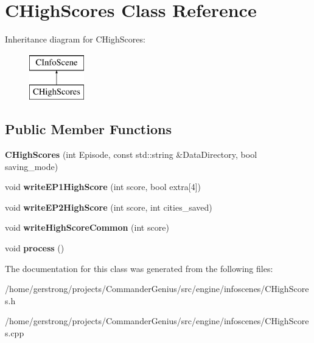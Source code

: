 \hypertarget{class_c_high_scores}{
\section{CHighScores Class Reference}
\label{class_c_high_scores}
}
Inheritance diagram for CHighScores:\begin{figure}[H]
\begin{center}
\leavevmode
\includegraphics[height=2cm]{class_c_high_scores}
\end{center}
\end{figure}
\subsection*{Public Member Functions}
\begin{DoxyCompactItemize}
\item 
\hypertarget{class_c_high_scores_a0e7283df2cd0f785c17f355d31e802a8}{
{\bfseries CHighScores} (int Episode, const std::string \&DataDirectory, bool saving\_\-mode)}
\label{class_c_high_scores_a0e7283df2cd0f785c17f355d31e802a8}

\item 
\hypertarget{class_c_high_scores_abb10e42cfbe3ed8706d0a9bbb3a17d5f}{
void {\bfseries writeEP1HighScore} (int score, bool extra\mbox{[}4\mbox{]})}
\label{class_c_high_scores_abb10e42cfbe3ed8706d0a9bbb3a17d5f}

\item 
\hypertarget{class_c_high_scores_a52badfd542df20d7690cb4491e16974e}{
void {\bfseries writeEP2HighScore} (int score, int cities\_\-saved)}
\label{class_c_high_scores_a52badfd542df20d7690cb4491e16974e}

\item 
\hypertarget{class_c_high_scores_a930e9a214fc9db2a5f450f996070048e}{
void {\bfseries writeHighScoreCommon} (int score)}
\label{class_c_high_scores_a930e9a214fc9db2a5f450f996070048e}

\item 
\hypertarget{class_c_high_scores_a07985814787f4594a8e21cd43e57df6b}{
void {\bfseries process} ()}
\label{class_c_high_scores_a07985814787f4594a8e21cd43e57df6b}

\end{DoxyCompactItemize}


The documentation for this class was generated from the following files:\begin{DoxyCompactItemize}
\item 
/home/gerstrong/projects/CommanderGenius/src/engine/infoscenes/CHighScores.h\item 
/home/gerstrong/projects/CommanderGenius/src/engine/infoscenes/CHighScores.cpp\end{DoxyCompactItemize}
